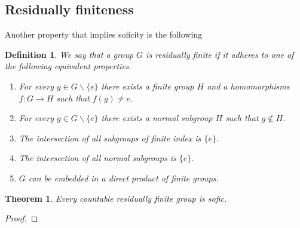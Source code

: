 \documentclass[titlepage, a4paper]{article}
\newtheorem{theorem}{Theorem}
\newtheorem{definition}{Definition}
\theoremstyle{remark}
\begin{document}
\subsection{Residually finiteness}

Another property that implies soficity is the following

\begin{definition}\cite{noauthor_residually_2018} \label{def:res_fin}
       We say that a group $G$ is residually finite if it adheres to one of the following equivalent properties.
        \begin{enumerate}
            \item For every $g \in G\backslash\{e\}$ there exists a finite group $H$ and a homomorphisms $f:G \to H$ such that $f(g) \ne e$.
            \item For every $g \in G\backslash\{e\}$ there exists a normal subgroup $H$ such that $g \notin H$.
            \item The intersection of all subgroups of finite index is $\{e\}$.
            \item The intersection of all normal subgroups is $\{e\}$.
            \item $G$ can be embedded in a direct product of finite groups.
        \end{enumerate}
    \end{definition}





    \begin{theorem}
        Every countable residually finite group is sofic.
    \end{theorem}
    \begin{proof}
        
    \end{proof}
\end{document}

